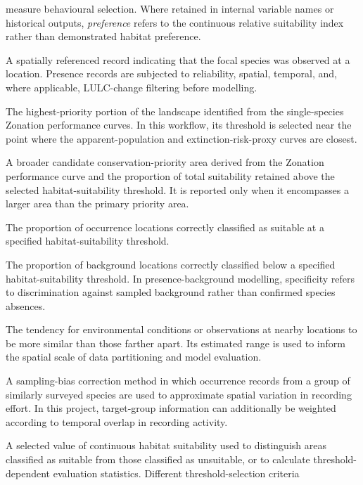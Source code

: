 \documentclass[
  openany]{book}
\begin{document}
\begin{description}
measure behavioural selection. Where retained in internal variable names or
historical outputs, \emph{preference} refers to the continuous relative suitability
index rather than demonstrated habitat preference.
\item[\textbf{Presence location}]
A spatially referenced record indicating that the focal species was observed
at a location. Presence records are subjected to reliability, spatial, temporal,
and, where applicable, LULC-change filtering before modelling.
\item[\textbf{Primary priority area}]
The highest-priority portion of the landscape identified from the single-species
Zonation performance curves. In this workflow, its threshold is selected near
the point where the apparent-population and extinction-risk-proxy curves are closest.
\item[\textbf{Secondary priority area}]
A broader candidate conservation-priority area derived from the Zonation
performance curve and the proportion of total suitability retained above the
selected habitat-suitability threshold. It is reported only when it encompasses
a larger area than the primary priority area.
\item[\textbf{Sensitivity}]
The proportion of occurrence locations correctly classified as suitable at a
specified habitat-suitability threshold.
\item[\textbf{Specificity}]
The proportion of background locations correctly classified below a specified
habitat-suitability threshold. In presence-background modelling, specificity
refers to discrimination against sampled background rather than confirmed species
absences.
\item[\textbf{Spatial autocorrelation}]
The tendency for environmental conditions or observations at nearby locations
to be more similar than those farther apart. Its estimated range is used to
inform the spatial scale of data partitioning and model evaluation.
\item[\textbf{Target-group approach}]
A sampling-bias correction method in which occurrence records from a group of
similarly surveyed species are used to approximate spatial variation in recording
effort. In this project, target-group information can additionally be weighted
according to temporal overlap in recording activity.
\item[\textbf{Threshold}]
A selected value of continuous habitat suitability used to distinguish areas
classified as suitable from those classified as unsuitable, or to calculate
threshold-dependent evaluation statistics. Different threshold-selection criteria

\end{description}
\end{document}
